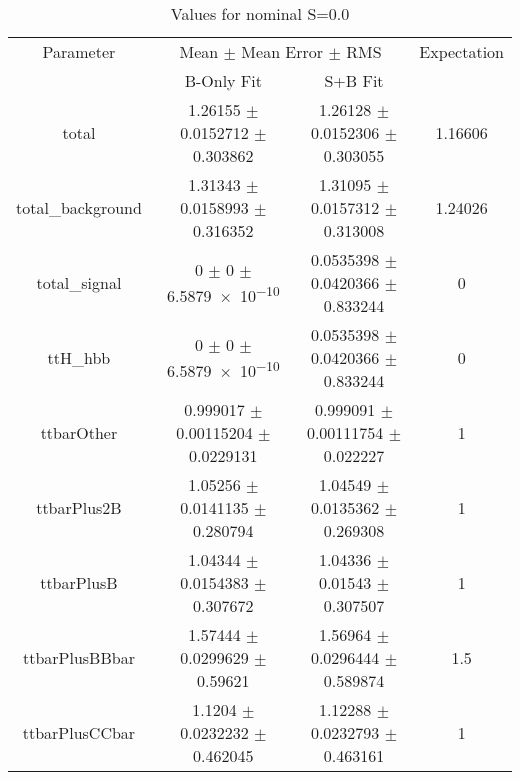 \begin{table}
\centering
\caption{Values for nominal S=0.0}
\begin{tabular}{cccc}
\toprule
Parameter & \multicolumn{2}{c}{Mean $\pm$ Mean Error $\pm$ RMS} & Expectation\\
 & B-Only Fit & S+B Fit & \\
\midrule
total & \num{1.26155} $\pm$ \num{0.0152712} $\pm$ \num{0.303862} & \num{1.26128} $\pm$ \num{0.0152306} $\pm$ \num{0.303055} & \num{1.16606}\\
total\_background & \num{1.31343} $\pm$ \num{0.0158993} $\pm$ \num{0.316352} & \num{1.31095} $\pm$ \num{0.0157312} $\pm$ \num{0.313008} & \num{1.24026}\\
total\_signal & \num{0} $\pm$ \num{0} $\pm$ \num{6.5879e-10} & \num{0.0535398} $\pm$ \num{0.0420366} $\pm$ \num{0.833244} & \num{0}\\
ttH\_hbb & \num{0} $\pm$ \num{0} $\pm$ \num{6.5879e-10} & \num{0.0535398} $\pm$ \num{0.0420366} $\pm$ \num{0.833244} & \num{0}\\
ttbarOther & \num{0.999017} $\pm$ \num{0.00115204} $\pm$ \num{0.0229131} & \num{0.999091} $\pm$ \num{0.00111754} $\pm$ \num{0.022227} & \num{1}\\
ttbarPlus2B & \num{1.05256} $\pm$ \num{0.0141135} $\pm$ \num{0.280794} & \num{1.04549} $\pm$ \num{0.0135362} $\pm$ \num{0.269308} & \num{1}\\
ttbarPlusB & \num{1.04344} $\pm$ \num{0.0154383} $\pm$ \num{0.307672} & \num{1.04336} $\pm$ \num{0.01543} $\pm$ \num{0.307507} & \num{1}\\
ttbarPlusBBbar & \num{1.57444} $\pm$ \num{0.0299629} $\pm$ \num{0.59621} & \num{1.56964} $\pm$ \num{0.0296444} $\pm$ \num{0.589874} & \num{1.5}\\
ttbarPlusCCbar & \num{1.1204} $\pm$ \num{0.0232232} $\pm$ \num{0.462045} & \num{1.12288} $\pm$ \num{0.0232793} $\pm$ \num{0.463161} & \num{1}\\
\bottomrule
\end{tabular}
\end{table}